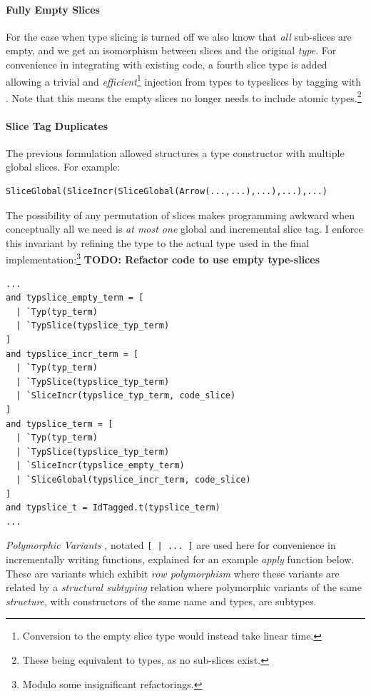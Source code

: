 \paragraph{Fully Empty Slices} For the case when type slicing is turned off we also know that \textit{all} sub-slices are empty, and we get an isomorphism between slices and the original \textit{type}. For convenience in integrating with existing code, a fourth slice type  is added allowing a trivial and \textit{efficient}\footnote{Conversion to the empty slice type would instead take linear time.} injection from types to typeslices by tagging with . Note that this means the empty slices  no longer needs to include atomic types.\footnote{These being equivalent to types, as no sub-slices exist.}

\paragraph{Slice Tag Duplicates}
The previous formulation allowed structures a type constructor with multiple global slices. For example: \begin{verbatim}
SliceGlobal(SliceIncr(SliceGlobal(Arrow(...,...),...),...),...)\end{verbatim}
The possibility of any permutation of slices makes programming awkward when conceptually all we need is \textit{at most one} global and incremental slice tag. 
I enforce this invariant by refining the type to the actual type used in the final implementation:\footnote{Modulo some insignificant refactorings.}
\textbf{TODO: Refactor code to use empty type-slices}
\begin{verbatim}
...
and typslice_empty_term = [
  | `Typ(typ_term)
  | `TypSlice(typslice_typ_term)
]
and typslice_incr_term = [
  | `Typ(typ_term)
  | `TypSlice(typslice_typ_term)
  | `SliceIncr(typslice_typ_term, code_slice)
]
and typslice_term = [
  | `Typ(typ_term)
  | `TypSlice(typslice_typ_term)
  | `SliceIncr(typslice_empty_term)
  | `SliceGlobal(typslice_incr_term, code_slice)
]
and typslice_t = IdTagged.t(typslice_term)
...
\end{verbatim}
\textit{Polymorphic Variants} \cite[ch. 7.4]{RealWorldOCaml}, notated \texttt{[ | ... ]} are used here for convenience in incrementally writing functions, explained for an example \textit{apply} function below. These are variants which exhibit \textit{row polymorphism} \cite{PolymorphicVariants} \cite[ch. 10.8]{ATTAPL} where these variants are related by a \textit{structural subtyping} relation \cite{StructuralSubtyping} where polymorphic variants of the same \textit{structure}, with constructors of the same name and types, are subtypes. 

